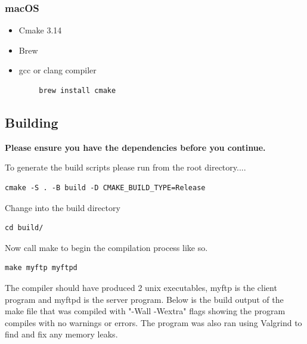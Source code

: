 \documentclass{article}
\begin{document}
\subsubsection*{macOS}
\begin{itemize}
    \item Cmake 3.14
    \item Brew
    \item gcc or clang compiler
\end{itemize}
\begin{lstlisting}
        brew install cmake
\end{lstlisting}
\subsection{Building}
\begin{center}
\textbf{Please ensure you have the dependencies before you continue.}
\end{center}
To generate the build scripts please run from the root directory....
\begin{lstlisting}
cmake -S . -B build -D CMAKE_BUILD_TYPE=Release    
\end{lstlisting}
Change into the build directory
\begin{lstlisting}
cd build/    
\end{lstlisting}
Now call make to begin the compilation process like so.
\begin{lstlisting}
make myftp myftpd    
\end{lstlisting}
The compiler should have produced 2 unix executables, myftp is the client program and myftpd is the server program. Below is the build output of the make file that was compiled with "-Wall -Wextra" flags showing the program compiles with no warnings or errors. The program was also ran using Valgrind to find and fix any memory leaks. 
\end{document}
